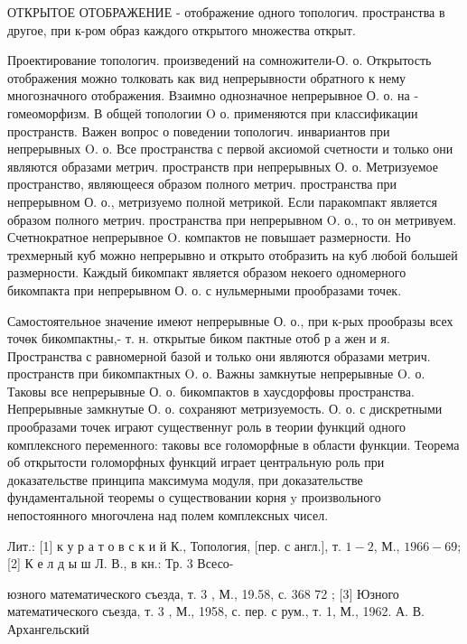\documentclass[10pt]{article}
\begin{document}
ОТКРЫТОЕ ОТОБРАЖЕНИЕ - отображение одного топологич. пространства в другое, при к-ром образ каждого открытого множества открыт.



Проектирование топологич. произведений на сомножители-О. о. Открытость отображения можно толковать как вид непрерывности обратного к нему многозначного отображения. Взаимно однозначное непрерывное О. о. на - гомеоморфизм. В общей топологии $\mathrm{O}$ о. применяются при классификации пространств. Важен вопрос о поведении топологич. инвариантов при непрерывных $\mathrm{O}$. о. Все пространства с первой аксиомой счетности и только они являются образами метрич. пространств при непрерывных О. о. Метризуемое пространство, являющееся образом полного метрич. пространства при непрерывном О. о., метризуемо полной метрикой. Если паракомпакт является образом полного метрич. пространства при непрерывном $\mathrm{O}$. о., то он метривуем. Счетнократное непрерывное $\mathrm{O}$. компактов не повышает размерности. Но трехмерный куб можно непрерывно и открыто отобразить на куб любой большей размерности. Каждый бикомпакт является образом некоего одномерного бикомпакта при непрерывном О. о. с нульмерными прообразами точек.



Самостоятельное значение имеют непрерывные О. о., при к-рых прообразы всех точөк бикомпактны,- т. н. открытые биком пактные отоб р а жен и я. Пространства с равномерной базой и только они являются образами метрич. пространств при бикомпактных $\mathrm{O}$. о. Важны замкнутые непрерывные $\mathrm{O}$. о. Таковы все непрерывные О. о. бикомпактов в хаусдорфовы пространства. Непрерывные замкнутые О. о. сохраняют метризуемость. О. о. с дискретными прообразами точек играют существеннуг роль в теории функций одного комплексного переменного: таковы все голоморфные в области функции. Теорема об открытости голоморфных функций играет центральную роль при доказательстве принципа максимума модуля, при доказательстве фундаментальной теоремы о существовании корня $\mathrm{y}$ произвольного непостоянного многочлена над полем комплексных чисел.



Лит.: [1] к у р а т о в с к и й К., Топология, [пер. с англ.], т. $1-2$, М., $1966-69$; [2] К е л д ы ш Л. В., в кн.: Тр. 3 Всесо-

юзного математического съезда, т. 3 , М., 19.58, с. 368 72 ; [3] Юзного математического съезда, т. 3 , М., 1958, с. пер. с рум., т. 1, М., 1962. А. В. Архангельский
\end{document}
